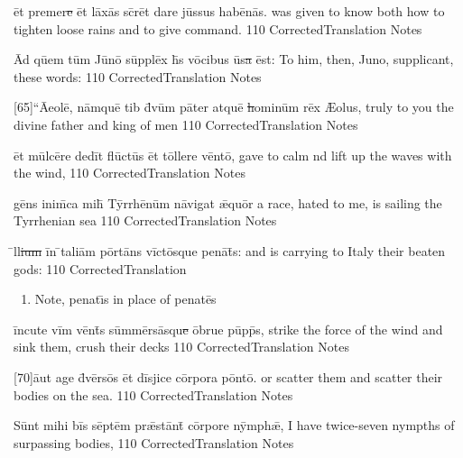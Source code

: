 \latline
  {\=et pr\-em\-er\sout{e }\=et l\=ax\={\macron a}s sc\={\macron {\i}}r\=et d\-ar\-e j\=uss\-us h\-ab\={\macron e}n\={\macron a}s.
}
  { was given to know both how to tighten loose rains and to give command. }
  {110}
  { CorrectedTranslation }
  { Notes }


\latline
  {\=Ad q\=uem t\=um J\={\macron u}n\={\macron o} s\=uppl\=ex h\={\macron {\i}}s v\={\macron o}c\-ib\-us \={\macron u}s\sout{a }\=est:
}
  { To him, then, Juno, supplicant, these words: }
  {110}
  { CorrectedTranslation }
  { Notes }


\latline
  {[65]``\=A\-e\-ol\=e, n\=amqu\=e t\-ib\-{\macron {\i}} d\={\macron {\i}}v\=um p\=at\-er \-atqu\=e\sout{ h}\-om\-in\=um r\={\macron e}x
}
  { {\AE}olus, truly to you the divine father and king of men }
  {110}
  { CorrectedTranslation }
  { Notes }


\latline
  {\=et m\=ulc\={\macron e}r\-e d\-ed\=it fl\={\macron u}ct\={\macron u}s \=et t\=oll\-er\-e v\=ent\={\macron o},
}
  { gave to calm nd lift up the waves with the wind, }
  {110}
  { CorrectedTranslation }
  { Notes }


\latline
  {g\={\macron e}ns \-in\-im\={\macron {\i}}c\-a m\-ih\={\macron {\i}} T\=yrrh\={\macron e}n\=um n\={\macron a}v\-ig\-at \={\ae}qu\=or
}
  { a race, hated to me, is sailing the Tyrrhenian sea }
  {110}
  { CorrectedTranslation }
  { Notes }



\latline
  {\={\macron {\i}}ll\sout{ium }\=in \={}t\-al\-i\=am p\=ort\={\macron a}ns v\=ict\={\macron o}squ\-e p\-en\={\macron a}t\={\macron {\i}}s:
}
  { and is carrying to Italy their beaten gods: }
  {110}
  { CorrectedTranslation }
  { \begin{enumerate}
  	\item Note, penat\={\i}s in place of penat\={e}s
  \end{enumerate} }


\latline
  {\=inc\-ut\-e v\=im v\=ent\={\macron {\i}}s s\=umm\=ers\={\macron a}squ\sout{e }\=obrue p\=upp\={\macron {\i}}s,
}
  { strike the force of the wind and sink them, crush their decks }
  {110}
  { CorrectedTranslation }
  { Notes }


\latline
  {[70]\={au}t \-ag\-e d\={\macron {\i}}v\=ers\={\macron o}s \=et d\=isj\-ic\-e c\=orp\-or\-a p\=ont\={\macron o}.
}
  { or scatter them and scatter their bodies on the sea. }
  {110}
  { CorrectedTranslation }
  { Notes }



\latline
  {S\=unt m\-ih\-i b\=is s\=ept\=em pr\={\ae}st\=ant\={\macron {\i}} c\=orp\-or\-e n\=ymph\={\ae},
}
  {I have twice-seven nympths of surpassing bodies, }
  {110}
  { CorrectedTranslation }
  { Notes }


